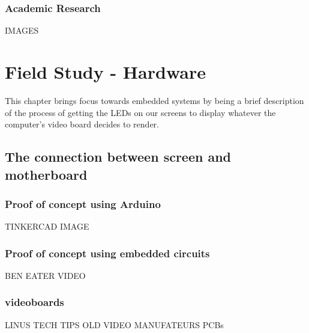         \subsection*{Academic Research}
            IMAGES


\chapter*{Field Study - Hardware}

    This chapter brings focus towards embedded systems by being a brief description of the process of getting the LEDs on our screens to display whatever the computer's video board decides to render. 

    \section*{The connection between screen and motherboard}
        \subsection*{Proof of concept using Arduino}
            TINKERCAD IMAGE
        \subsection*{Proof of concept using embedded circuits}
            BEN EATER VIDEO
        \subsection*{videoboards}
            LINUS TECH TIPS OLD VIDEO MANUFATEURS PCBs






